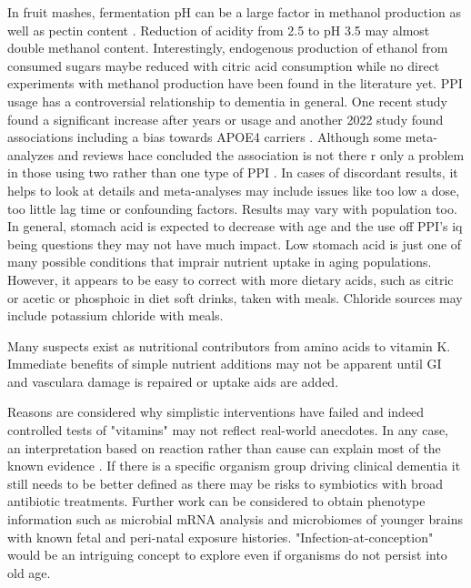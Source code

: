 \documentclass[aps,secnumarabic,balancelastpage,amsmath,amssymb,nofootinbib]{revtex4}
\begin{document}
In fruit mashes, fermentation pH can be a large factor in methanol
production as well as pectin content 
\cite{Blumenthal_Steger_Einfalt_Methanol_Mitigation_during_Manufacturing_2021}.
Reduction of acidity from 2.5 to pH 3.5 may almost double
methanol content. 
Interestingly, endogenous production of ethanol from consumed
sugars maybe reduced with citric acid consumption 
\cite{10.3389/fmicb.2016.00047} while no direct experiments
with methanol production have been found in the literature yet.
PPI usage has a controversial relationship to dementia
in general. 
One recent study found a significant increase after years or usage
\cite{Northuis10.1212/WNL.0000000000207747}
and another 2022 study found associations
including a  bias towards APOE4 carriers
\cite{Zhang_Li_Chen_Regular_proton_pump_inhibitor_2022}.
Although some meta-analyzes and reviews hace concluded the association is
not there 
\cite{PMC10229084}
r only a problem in those using two rather than one type of PPI
\cite{TorresBondia_Dakterzada_Galvan_Proton_pump_inhibitors_2020}.
In cases of discordant results, it helps to look at details and meta-analyses
may include issues like too low a dose, too little lag time or 
confounding factors. Results may vary with population too.
In general, stomach acid is expected to decrease with age
and the use off PPI's iq being questions \cite{Mehta_Guasch_Kamen_Proton_Pump_Inhibitors_2020} they may not have much impact. 
Low stomach acid is just one of many possible conditions
that imprair nutrient uptake in aging populations.
However, it appears to be easy to correct with more
dietary acids, such as citric or acetic or phosphoic in diet
soft drinks, taken   with meals.
Chloride sources may include potassium chloride with meals.

Many suspects
exist as nutritional contributors from amino acids to vitamin K. 
Immediate benefits of simple nutrient additions may
not be apparent until GI and vasculara damage is repaired
or uptake aids are added. 

Reasons are considered why simplistic
interventions have failed and indeed controlled tests
of "vitamins" may not reflect real-world anecdotes.
In any case, an interpretation based on reaction rather
than cause can explain most of the known evidence 
. If there is a specific organism group driving clinical
dementia it still needs to be better defined 
as there may be risks to symbiotics with broad antibiotic treatments. 
Further work can be considered to obtain phenotype information
such as microbial mRNA analysis and microbiomes of
younger brains with known fetal and peri-natal exposure histories.  
"Infection-at-conception" would be an intriguing concept to explore
even if organisms do not persist into old age. 
\end{document}
